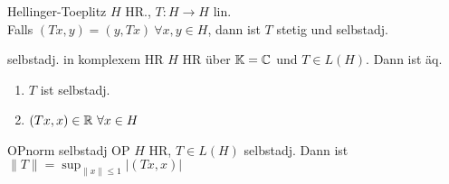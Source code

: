 \begin{satz}{Hellinger-Toeplitz}
    \(H\) HR., \(T:H\to H\) lin.\\
    Falls \((Tx,y) = (y,Tx)\ \forall x,y\in H\), dann ist \(T\) stetig 
    und selbstadj.
\end{satz}

\begin{satz}{selbstadj. in komplexem HR}
    \(H\) HR über \(\mathbb{K} = \mathbb{C}\) und \(T\in L(H)\). Dann ist äq.
    \begin{enumerate}[label = (\roman*)]
        \item \(T\) ist selbstadj.
        \item \((Tx,x) \in \mathbb{R}\ \forall x\in H\)
    \end{enumerate}
\end{satz}

\begin{satz}{OPnorm selbstadj OP}
    \(H\) HR, \(T\in L(H)\) selbstadj. Dann ist
    \(\|T\| = \sup_{\|x\|\leq 1} |(Tx,x)|\)
\end{satz}